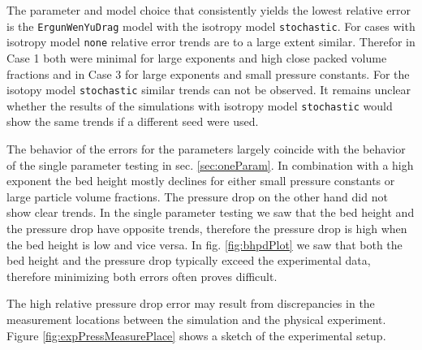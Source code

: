 
The parameter and model choice that consistently yields the lowest relative error is the \lstinline|ErgunWenYuDrag| model with the isotropy model \lstinline|stochastic|.
For cases with isotropy model \lstinline|none| relative error trends are to a large extent similar. Therefor in Case 1 both were minimal for large exponents and high close packed volume fractions and in Case 3 for large exponents and small pressure constants.
For the isotopy model \lstinline|stochastic| similar trends can not be observed. 
It remains unclear whether the results of the simulations with isotropy model \lstinline|stochastic| would show the same trends if a different seed were used.

The behavior of the errors for the parameters largely coincide with the behavior of the single parameter testing in sec. \ref{sec:oneParam}. In combination with a high exponent the bed height mostly declines for either small pressure constants or large particle volume fractions.
The pressure drop on the other hand did not show clear trends. In the single parameter testing we saw that the bed height and the pressure drop have opposite trends, therefore the pressure drop is high when the bed height is low and vice versa. In fig. \ref{fig:bhpdPlot} we saw that both the bed height and the pressure drop typically exceed the experimental data, therefore minimizing both errors often proves difficult.

The high relative pressure drop error may result from discrepancies in the measurement locations between the simulation and the physical experiment.
Figure \ref{fig:expPressMeasurePlace} shows a sketch of the experimental setup.

